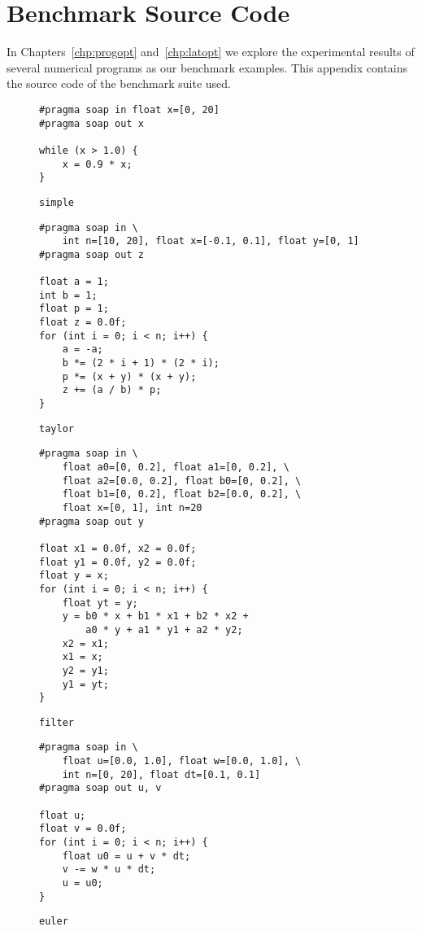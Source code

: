\chapter{Benchmark Source Code}
\label{app:source}

In Chapters~\ref{chp:progopt} and~\ref{chp:latopt} we explore the experimental
results of several numerical programs as our benchmark examples.  This appendix
contains the source code of the benchmark suite used.

\begin{figure}[ht]
\begin{lstlisting}
#pragma soap in float x=[0, 20]
#pragma soap out x

while (x > 1.0) {
    x = 0.9 * x;
}
\end{lstlisting}
\caption{\texttt{simple}}
\end{figure}

\begin{figure}[ht]
\begin{lstlisting}
#pragma soap in \
    int n=[10, 20], float x=[-0.1, 0.1], float y=[0, 1]
#pragma soap out z

float a = 1;
int b = 1;
float p = 1;
float z = 0.0f;
for (int i = 0; i < n; i++) {
    a = -a;
    b *= (2 * i + 1) * (2 * i);
    p *= (x + y) * (x + y);
    z += (a / b) * p;
}
\end{lstlisting}
\caption{\texttt{taylor}}
\end{figure}

\begin{figure}[ht]
\begin{lstlisting}
#pragma soap in \
    float a0=[0, 0.2], float a1=[0, 0.2], \
    float a2=[0.0, 0.2], float b0=[0, 0.2], \
    float b1=[0, 0.2], float b2=[0.0, 0.2], \
    float x=[0, 1], int n=20
#pragma soap out y

float x1 = 0.0f, x2 = 0.0f;
float y1 = 0.0f, y2 = 0.0f;
float y = x;
for (int i = 0; i < n; i++) {
    float yt = y;
    y = b0 * x + b1 * x1 + b2 * x2 +
        a0 * y + a1 * y1 + a2 * y2;
    x2 = x1;
    x1 = x;
    y2 = y1;
    y1 = yt;
}
\end{lstlisting}
\caption{\texttt{filter}}
\end{figure}

\begin{figure}[ht]
\begin{lstlisting}
#pragma soap in \
    float u=[0.0, 1.0], float w=[0.0, 1.0], \
    int n=[0, 20], float dt=[0.1, 0.1]
#pragma soap out u, v

float u;
float v = 0.0f;
for (int i = 0; i < n; i++) {
    float u0 = u + v * dt;
    v -= w * u * dt;
    u = u0;
}
\end{lstlisting}
\caption{\texttt{euler}}
\end{figure}

